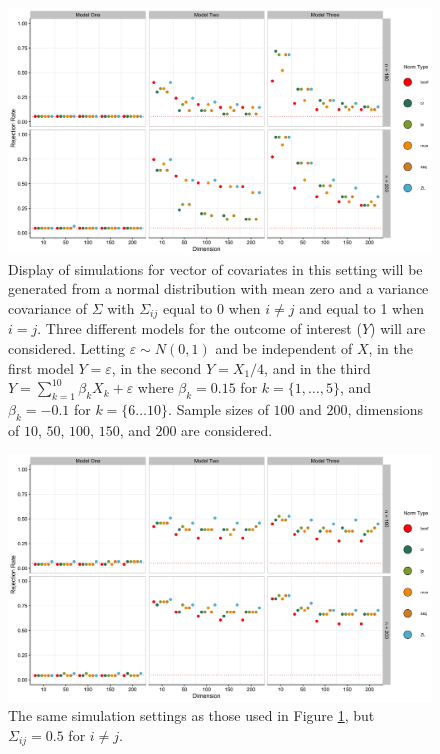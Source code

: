 \documentclass{article}
\begin{document}
\begin{figure}[]
	\centering
\includegraphics[width = \linewidth]{uncor.jpg}
	\caption{Display of simulations for vector of covariates in this setting will be generated from a normal distribution with mean zero and a variance covariance of $\Sigma$ with $\Sigma_{ij}$ equal to $0$ when $i \neq j$ and equal to 1 when $i = j$. Three different models for the outcome of interest ($Y$) will are considered. Letting $\varepsilon \sim N(0, 1)$ and be independent of $X$, in the first model $Y = \varepsilon$, in the second $Y = X_1 / 4$, and in the third $Y = \sum_{k = 1}^{10} \beta_k X_k + \varepsilon$ where $\beta_k = 0.15$ for $k = \{1, \dots, 5\}$, and $\beta_k = -0.1$ for $k = \{6 \dots 10\}$. Sample sizes of $100$ and $200$, dimensions of $10$, $50$, $100$, $150$, and $200$ are considered.}
	\label{fig:uncor}
\end{figure}

\begin{figure}[]
	\centering
\includegraphics[width = \linewidth]{some_core.jpg}
	\caption{The same simulation settings as those used in Figure \ref{fig:uncor}, but $\Sigma_{ij} = 0.5$ for $i \neq j$.}
	\label{fig:somecor}
\end{figure}	
\end{document}
